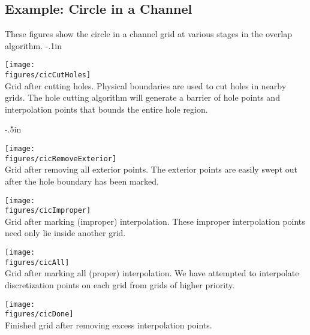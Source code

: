 \clearpage
\newcommand{\figWidthc}{10cm}
\subsection{Example: Circle in a Channel}

These figures show the circle in a channel grid at various stages in the overlap algorithm.
\vglue-.1in
  \begin{center}
   \texttt{[image: \\figures/cicCutHoles]}\\
  {Grid after cutting holes. Physical boundaries are used to cut
      holes in nearby grids. The hole cutting algorithm will generate a barrier of hole points and
      interpolation points that bounds the entire hole region.}
  \end{center}
\vglue-.5in
  \begin{center}
   \texttt{[image: \\figures/cicRemoveExterior]}\\
  {Grid after removing all exterior points. The exterior points are easily swept out
      after the hole boundary has been marked.}
  \end{center}
  \begin{center}
   \texttt{[image: \\figures/cicImproper]}\\
  {Grid after marking (improper) interpolation. These improper interpolation points need only lie
    inside another grid.}
  \end{center}
  \begin{center}
   \texttt{[image: \\figures/cicAll]}\\
  {Grid after marking all (proper) interpolation. We have attempted to interpolate
     discretization points on each grid from grids of higher priority.}
  \end{center}
  \begin{center}
   \texttt{[image: \\figures/cicDone]}\\
  {Finished grid after removing excess interpolation points.}
  \end{center}


